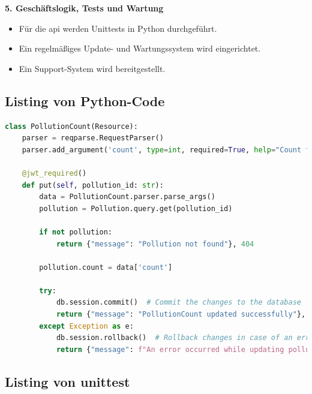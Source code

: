 \documentclass[a4paper,12pt]{article}
\begin{document}
\noindent\textbf{5. Geschäftslogik, Tests und Wartung}
\begin{itemize}
    \item Für die \gls{api} werden Unittests in Python durchgeführt.
    \item Ein regelmäßiges Update- und Wartungssystem wird eingerichtet.
    \item Ein Support-System wird bereitgestellt.
\end{itemize}

\clearpage
\subsection{Listing von Python-Code}
\label{sec:python-code}

\begin{lstlisting}[language=Python, caption=Implementation der PollutionCount-Klasse, label=lst:pollutionCount]
class PollutionCount(Resource):
    parser = reqparse.RequestParser()
    parser.add_argument('count', type=int, required=True, help="Count field is required")

    @jwt_required()
    def put(self, pollution_id: str):
        data = PollutionCount.parser.parse_args()
        pollution = Pollution.query.get(pollution_id)

        if not pollution:
            return {"message": "Pollution not found"}, 404

        pollution.count = data['count']

        try:
            db.session.commit()  # Commit the changes to the database
            return {"message": "PollutionCount updated successfully"}, 200
        except Exception as e:
            db.session.rollback()  # Rollback changes in case of an error
            return {"message": f"An error occurred while updating pollution: {str(e)}"}, 500
\end{lstlisting}

\clearpage
\subsection{Listing von unittest}
\label{sec:unittest}
\end{document}
